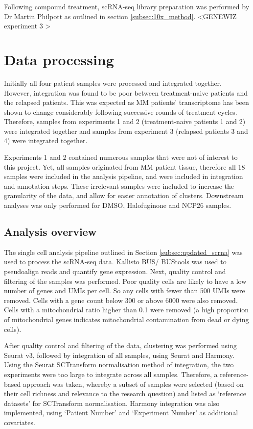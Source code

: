 Following compound treatment, scRNA-seq library preparation was performed by Dr Martin Philpott as outlined in section \ref{subsec:10x_method}.
<GENEWIZ experiment 3 >


\section{Data processing}
Initially all four patient samples were processed and integrated together.
However, integration was found to be poor between treatment-naive patients and the relapsed patients.
This was expected as MM patients' transcriptome has been shown to change considerably following successive rounds of treatment cycles.
Therefore, samples from experiments 1 and 2 (treatment-naive patients 1 and 2) were integrated together and samples from experiment 3 (relapsed patients 3 and 4) were integrated together.

Experiments 1 and 2 contained numerous samples that were not of interest to this project.
Yet, all samples originated from MM patient tissue, therefore all 18 samples were included in the analysis pipeline, and were included in integration and annotation steps.
These irrelevant samples were included to increase the granularity of the data, and allow for easier annotation of clusters.
Downstream analyses was only performed for DMSO, Halofuginone and NCP26 samples.

\subsection{Analysis overview}

The single cell analysis pipeline outlined in Section \ref{subsec:updated_scrna} was used to process the scRNA-seq data.
Kallisto BUS/ BUStools was used to pseudoalign reads and quantify gene expression.
Next, quality control and filtering of the samples was performed.
Poor quality cells are likely to have a low number of genes and UMIs per cell.
So any cells with fewer than 500 UMIs were removed.
Cells with a gene count below 300 or above 6000 were also removed.
Cells with a mitochondrial ratio higher than 0.1 were removed (a high proportion of mitochondrial genes indicates mitochondrial contamination from dead or dying cells).

After quality control and filtering of the data, clustering was performed using Seurat v3, followed by integration of all samples, using Seurat and Harmony.
Using the Seurat SCTransform normalisation method of integration, the two experiments were too large to integrate across all samples.
Therefore, a reference-based approach was taken, whereby a subset of samples were selected (based on their cell richness and relevance to the research question) and listed as `reference datasets' for SCTransform normalisation.
Harmony integration was also implemented, using `Patient Number' and `Experiment Number' as additional covariates.

